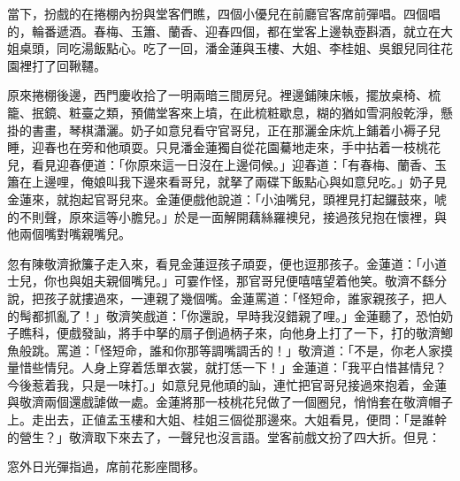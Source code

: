 當下，扮戲的在捲棚內扮與堂客們瞧，四個小優兒在前廳官客席前彈唱。四個唱的，輪番遞酒。春梅、玉簫、蘭香、迎春四個，都在堂客上邊執壺斟酒，就立在大姐桌頭，同吃湯飯點心。吃了一回，潘金蓮與玉樓、大姐、李桂姐、吳銀兒同往花園裡打了回鞦韆。

原來捲棚後邊，西門慶收拾了一明兩暗三間房兒。裡邊鋪陳床帳，擺放桌椅、梳籠、抿鏡、粧臺之類，預備堂客來上墳，在此梳粧歇息，糊的猶如雪洞般乾淨，懸掛的書畫，琴棋瀟灑。奶子如意兒看守官哥兒，正在那灑金床炕上鋪着小褥子兒睡，迎春也在旁和他頑耍。只見潘金蓮獨自從花園驀地走來，手中拈着一枝桃花兒，{}看見迎春便道：「你原來這一日沒在上邊伺候。」迎春道：「有春梅、蘭香、玉簫在上邊哩，俺娘叫我下邊來看哥兒，就拏了兩碟下飯點心與如意兒吃。」奶子見金蓮來，就抱起官哥兒來。金蓮便戲他說道：「小油嘴兒，頭裡見打起鑼鼓來，唬的不則聲，原來這等小膽兒。」於是一面解開藕絲羅襖兒，接過孩兒抱在懷裡，與他兩個嘴對嘴親嘴兒。

忽有陳敬濟掀簾子走入來，看見金蓮逗孩子頑耍，便也逗那孩子。金蓮道：「小道士兒，你也與姐夫親個嘴兒。」可霎作怪，那官哥兒便嘻嘻望着他笑。{}敬濟不繇分說，把孩子就摟過來，一連親了幾個嘴。金蓮罵道：「怪短命，誰家親孩子，把人的髩都抓亂了！」敬濟笑戲道：「你還說，早時我沒錯親了哩。」{}金蓮聽了，恐怕奶子瞧科，便戲發訕，將手中拏的扇子倒過柄子來，向他身上打了一下，打的敬濟鯽魚般跳。罵道：「怪短命，誰和你那等調嘴調舌的！」敬濟道：「不是，你老人家摸量惜些情兒。人身上穿着恁單衣裳，就打恁一下！」金蓮道：「我平白惜甚情兒？今後惹着我，只是一味打。」{}如意兒見他頑的訕，連忙把官哥兒接過來抱着，金蓮與敬濟兩個還戲謔做一處。金蓮將那一枝桃花兒做了一個圈兒，悄悄套在敬濟帽子上。{}走出去，正値孟玉樓和大姐、桂姐三個從那邊來。大姐看見，便問：「是誰幹的營生？」敬濟取下來去了，一聲兒也沒言語。堂客前戲文扮了四大折。但見：

\begin{myquote}
窓外日光彈指過，席前花影座間移。
\end{myquote}


